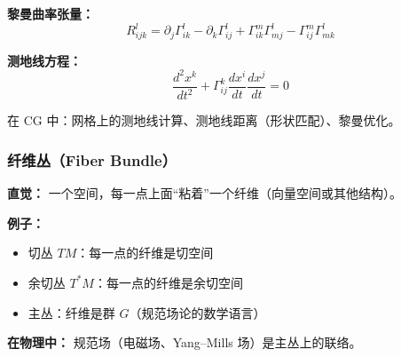\textbf{黎曼曲率张量：}
\[
R^l_{ijk} = \partial_j \Gamma^l_{ik} - \partial_k \Gamma^l_{ij} + \Gamma^m_{ik}\Gamma^l_{mj} - \Gamma^m_{ij}\Gamma^l_{mk}
\]

\textbf{测地线方程：}
\[
\frac{d^2 x^k}{dt^2} + \Gamma^k_{ij}\frac{dx^i}{dt}\frac{dx^j}{dt} = 0
\]

在 CG 中：网格上的测地线计算、测地线距离（形状匹配）、黎曼优化。

\subsubsection{纤维丛（Fiber Bundle）}

\textbf{直觉：} 一个空间，每一点上面“粘着”一个纤维（向量空间或其他结构）。

\textbf{例子：}
\begin{itemize}
  \item 切丛 $TM$：每一点的纤维是切空间
  \item 余切丛 $T^*M$：每一点的纤维是余切空间
  \item 主丛：纤维是群 $G$（规范场论的数学语言）
\end{itemize}

\textbf{在物理中：} 规范场（电磁场、Yang--Mills 场）是主丛上的联络。
